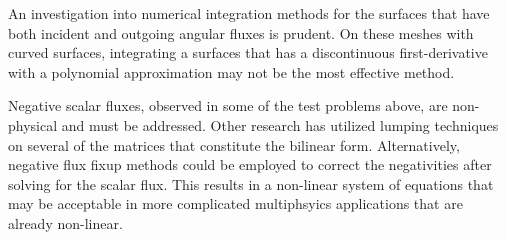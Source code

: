 \documentclass[12pt]{article}
\begin{document}
An investigation into numerical integration methods for the surfaces that have both incident and outgoing angular fluxes is prudent. On these meshes with curved surfaces, integrating a surfaces that has a discontinuous first-derivative with a polynomial approximation may not be the most effective method.

Negative scalar fluxes, observed in some of the test problems above, are non-physical and must be addressed. Other research has utilized lumping techniques on several of the matrices that constitute the bilinear form. Alternatively, negative flux fixup methods could be employed to correct the negativities after solving for the scalar flux. This results in a non-linear system of equations that may be acceptable in more complicated multiphsyics applications that are already non-linear.



%
%
\end{document}
